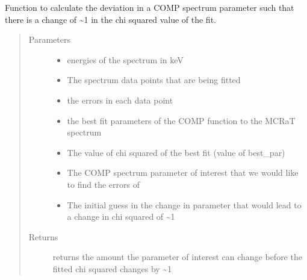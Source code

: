 \documentclass[letterpaper,10pt,english]{sphinxmanual}
\begin{document}

\begin{fulllineitems}
\label{\detokenize{read_process_files:read_process_files.param_err_loop_comp}}
Function to calculate the deviation in a COMP spectrum parameter such that there is a change of \textasciitilde{}1 in the chi squared
value of the fit.
\begin{quote}\begin{description}
\item[{Parameters}] \leavevmode\begin{itemize}
\item {} 
 \textendash{} energies of the spectrum in keV

\item {} 
 \textendash{} The spectrum data points that are being fitted

\item {} 
 \textendash{} the errors in each data point

\item {} 
 \textendash{} the best fit parameters of the COMP function to the MCRaT spectrum

\item {} 
 \textendash{} The value of chi squared of the best fit (value of best\_par)

\item {} 
 \textendash{} The COMP spectrum parameter of interest that we would like to find the errors of

\item {} 
 \textendash{} The initial guess in the change in parameter that would lead to a change in chi squared of \textasciitilde{}1

\end{itemize}

\item[{Returns}] \leavevmode
returns the amount the parameter of interest can change before the fitted chi squared changes by \textasciitilde{}1

\end{description}\end{quote}

\end{fulllineitems}
\end{document}
